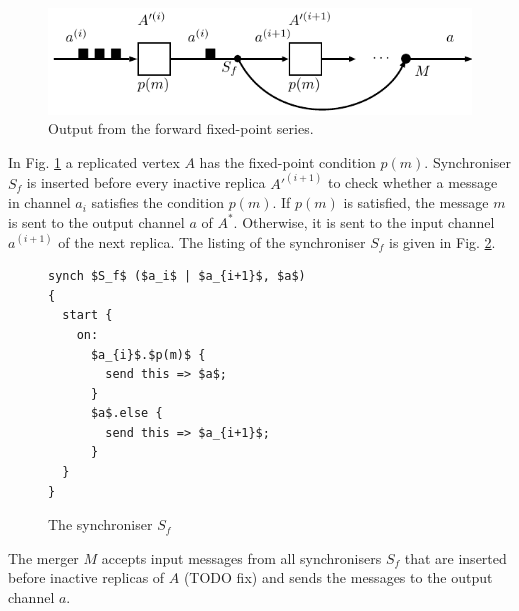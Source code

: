   \begin{figure}[h!]
  \centering
  \includegraphics{figs/chapter_04_ffp_out.pdf}
  \caption{Output from the forward fixed-point series.}
  \label{fig:ffp_out}
  \end{figure}

In Fig. \ref{fig:ffp_out} a replicated vertex $A$ has the fixed-point condition $p(m)$. Synchroniser $S_f$ is inserted before every inactive replica $A'^{(i+1)}$ to check whether a message in channel $a_{i}$ satisfies the condition $p(m)$. If $p(m)$ is satisfied, the message $m$ is sent to the output channel $a$ of $A^{*}$. Otherwise, it is sent to the input channel $a^{(i+1)}$ of the next replica. The listing of the synchroniser $S_f$ is given in Fig. \ref{ffp:synch_filt}.

\begin{figure}[h!]
\begin{lstlisting}[frame=single,mathescape]
synch $S_f$ ($a_i$ | $a_{i+1}$, $a$)
{
  start {
    on:
      $a_{i}$.$p(m)$ {
        send this => $a$;
      }
      $a$.else {
        send this => $a_{i+1}$;
      }
  }
}
\end{lstlisting}
\caption{The synchroniser $S_f$}
\label{ffp:synch_filt}
\end{figure}

The merger $M$ accepts input messages from all synchronisers $S_f$ that are inserted before inactive replicas of $A$ (TODO fix) and sends the messages to the output channel $a$.





